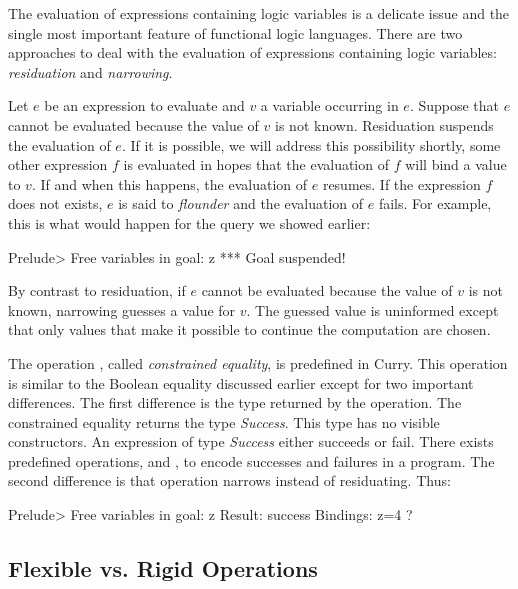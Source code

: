 The evaluation of expressions containing logic variables
is a delicate issue and the single most important feature
of functional logic languages.
There are two approaches to deal with the evaluation of
expressions containing logic variables:
\emph{residuation} and
\emph{narrowing}.

Let $e$ be an expression to evaluate and $v$ a variable
occurring in $e$.
Suppose that $e$ cannot be evaluated because the value of
$v$ is not known.
Residuation suspends the evaluation of $e$.
If it is possible, we will address this possibility shortly,
some other expression $f$ is evaluated in hopes that the evaluation
of $f$ will bind a value to $v$.  If and when this happens,
the evaluation of $e$ resumes.
If the expression $f$ does not exists, $e$ is said to
\emph{flounder} and the evaluation of $e$
fails.
For example, this is what would happen for the query we showed
earlier:
%
\begin{prog}
Prelude> 
Free variables in goal: z
*** Goal suspended!
\end{prog}
%
By contrast to residuation, 
if $e$ cannot be evaluated because the value of $v$ is not known,
narrowing guesses a value for $v$.
The guessed value is uninformed except that only values that
make it possible to continue the computation are chosen.

The operation \ccode{=:=},
called \emph{constrained equality},
is predefined in Curry.
This operation is similar to the Boolean equality
discussed earlier except for two important differences.
The first difference is the type returned by the operation.
The constrained equality returns the type \emph{Success}.
This type has no visible constructors.
An expression of type \emph{Success} either succeeds or fail.
There exists predefined operations,  and
, to encode successes and failures in a
program.
The second difference is that operation \ccode{=:=}
narrows instead of residuating.
Thus:
%
\begin{prog}
Prelude> 
Free variables in goal: z
Result: success
Bindings: 
z=4 ? 
\end{prog}
%
\vspace*{-5ex}
\subsection{Flexible vs. Rigid Operations}

